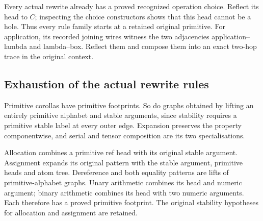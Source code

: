 
Every actual rewrite already has a proved recognized operation choice.
Reflect its head to $C$; inspecting the choice constructors shows that this
head cannot be a hole. Thus every rule family starts at a retained original
primitive. For application, its recorded joining wires witness the two
adjacencies application--lambda and lambda--box. Reflect them and compose
them into an exact two-hop trace in the original context.


\subsection{Exhaustion of the actual rewrite rules}
Primitive corollas have primitive footprints. So do graphs obtained by
lifting an entirely primitive alphabet and stable arguments, since stability
requires a primitive stable label at every outer edge. Expansion preserves
the property componentwise, and serial and tensor composition are its two
specialisations.


Allocation combines a primitive ref head with its original stable argument.
Assignment expands its original pattern with the stable argument, primitive
heads and atom tree. Dereference and both equality patterns are lifts of
primitive-alphabet graphs. Unary arithmetic combines its head and numeric
argument; binary arithmetic combines its head with two numeric arguments.
Each therefore has a proved primitive footprint. The original stability
hypotheses for allocation and assignment are retained.

